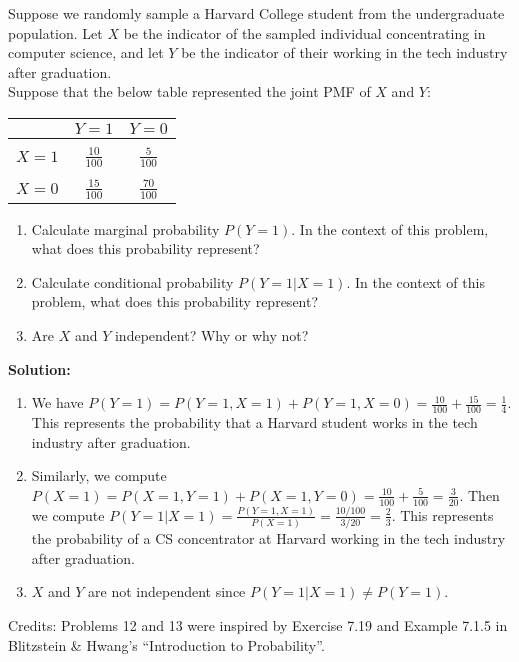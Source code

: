 \documentclass{harvardml}
\theoremstyle{definition}
\theoremstyle{plain}
\begin{document}
\begin{problem}

Suppose we randomly sample a Harvard College student from the undergraduate population.  Let $X$ be the indicator of the sampled individual concentrating in computer science, and let $Y$ be the indicator of their working in the tech industry after graduation.\\

Suppose that the below table represented the joint PMF of $X$ and $Y$:

\begin{center}
\begin{tabular}{ c | c c }
  & $Y = 1$ & $Y = 0$ \\ \hline\\
 $X = 1$ & $\frac{10}{100}$ & $\frac{5}{100}$ \\  \\
 $X = 0$ & $\frac{15}{100}$ & $\frac{70}{100}$ \\   
\end{tabular}
\end{center}

\begin{enumerate}[label=(\alph*)] 
\item Calculate marginal probability $P(Y = 1)$.  In the context of this problem, what does this probability represent?
\item Calculate conditional probability $P(Y = 1 | X = 1)$.  In the context of this problem, what does this probability represent?
\item Are $X$ and $Y$ independent?  Why or why not?

\end{enumerate}

\noindent \textbf{Solution:}
\begin{enumerate}[label=(\alph*)]
    \item We have $P(Y=1) = P(Y=1, X=1) + P(Y=1, X=0) = \frac{10}{100} + \frac{15}{100} = \frac{1}{4}$. This represents the probability that a Harvard student works in the tech industry after graduation.
    \item Similarly, we compute $P(X=1) = P(X=1, Y=1) + P(X=1, Y=0) = \frac{10}{100} + \frac{5}{100} = \frac{3}{20}$. Then we compute $P(Y=1 | X=1) = \frac{P(Y=1, X=1)}{P(X=1)} = \frac{10/100}{3/20} = \frac{2}{3}.$ This represents the probability of a CS concentrator at Harvard working in the tech industry after graduation.
    \item $X$ and $Y$ are not independent since $P(Y=1|X=1) \neq P(Y=1).$
\end{enumerate}

\end{problem}



\noindent Credits:  Problems 12 and 13 were inspired by Exercise 7.19 and  Example 7.1.5 in Blitzstein \& Hwang's ``Introduction to Probability''.
\end{document}
